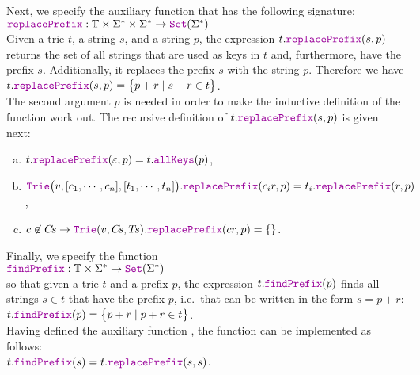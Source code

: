 Next, we specify the auxiliary function  that has the following signature:
\\[0.2cm]
\hspace*{1.3cm}
$\mytt{replacePrefix}: \mathbb{T} \times \Sigma^* \times \Sigma^* \rightarrow \mytt{Set}(\Sigma^*)$
\\[0.2cm]
Given a trie $t$, a string $s$, and a string $p$, the expression $t.\mytt{replacePrefix}(s, p)$ returns the
set of all strings that are used as keys in $t$ 
and, furthermore, have the prefix $s$.  Additionally, it replaces the prefix $s$ with the string $p$.  Therefore
we have
\\[0.2cm]
\hspace*{1.3cm}
$t.\mytt{replacePrefix}(s, p) = \bigl\{ p+r \mid s + r \in t \bigr\}$.
\\[0.2cm]
The second argument $p$ is needed in order to make the inductive definition of the function
 work out.  The recursive definition of $t.\mytt{replacePrefix}(s, p)$ is given next:
\begin{enumerate}[(a)]
\item $t.\mytt{replacePrefix}(\varepsilon, p) = t.\mytt{allKeys}(p)$,
\item $\mytt{Trie}\bigl(v, [c_1, \cdots, c_n], [t_1,\cdots,t_n]\bigr).\mytt{replacePrefix}(c_ir, p) = 
       t_i.\mytt{replacePrefix}(r, p) 
      $,
\item $c \not\in C\!s \rightarrow \mytt{Trie}(v, C\!s, T\!s).\mytt{replacePrefix}(cr, p) = \{\}$.
\end{enumerate}
Finally, we specify the function 
\\[0.2cm]
\hspace*{1.3cm}
$\mytt{findPrefix}:\mathbb{T} \times \Sigma^* \rightarrow \mytt{Set}(\Sigma^*)$
\\[0.2cm]
so that given a trie $t$ and a prefix $p$, the expression $t.\mytt{findPrefix}(p)$ finds all
strings $s \in t$ that have the prefix $p$, i.e.~that can be written in the form $s=p+r$:
\\[0.2cm]
\hspace*{1.3cm}
$t.\mytt{findPrefix}(p) = \bigl\{ p+r \mid p+r \in t \bigr\}$.
\\[0.2cm]
Having defined the auxiliary function , the function  can be
implemented as follows:
\\[0.2cm]
\hspace*{1.3cm}
$t.\mytt{findPrefix}(s) = t.\mytt{replacePrefix}(s, s)$.



